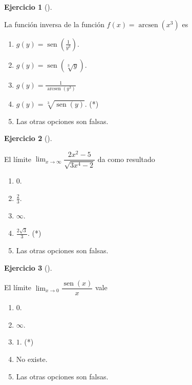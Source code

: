 \documentclass[
  a4paper,
]{scrreport}
\theoremstyle{definition}
\newtheorem{exercise}{Ejercicio}[chapter]
\theoremstyle{remark}
\begin{document}
\begin{exercise}[]\protect\hypertarget{exr-16}{}\label{exr-16}

La función inversa de la función \(f(x)=\operatorname{arcsen}(x^3)\) es

\begin{enumerate}
\def\labelenumi{\alph{enumi}.}
\item
  \(g(y)=\operatorname{sen}\left(\frac{1}{y^3}\right)\).
\item
  \(g(y)=\operatorname{sen}(\sqrt[3]{y})\).
\item
  \(g(y)=\frac{1}{\operatorname{arcsen}(y^3)}\)
\item
  \(g(y)=\sqrt[3]{\operatorname{sen}(y)}\). (*)
\item
  Las otras opciones son falsas.
\end{enumerate}

\end{exercise}

\begin{exercise}[]\protect\hypertarget{exr-17}{}\label{exr-17}

El límite \(\lim_{x\to\infty} \dfrac{2x^2-5}{\sqrt{3x^4-2}}\) da como
resultado

\begin{enumerate}
\def\labelenumi{\alph{enumi}.}
\item
  \(0\).
\item
  \(\frac{2}{3}\).
\item
  \(\infty\).
\item
  \(\frac{2\sqrt{3}}{3}\). (*)
\item
  Las otras opciones son falsas.
\end{enumerate}

\end{exercise}

\begin{exercise}[]\protect\hypertarget{exr-18}{}\label{exr-18}

El límite \(\lim_{x\to 0}\dfrac{\operatorname{sen}(x)}{x}\) vale

\begin{enumerate}
\def\labelenumi{\alph{enumi}.}
\item
  \(0\).
\item
  \(\infty\).
\item
  \(1\). (*)
\item
  No existe.
\item
  Las otras opciones son falsas.
\end{enumerate}

\end{exercise}
\end{document}
